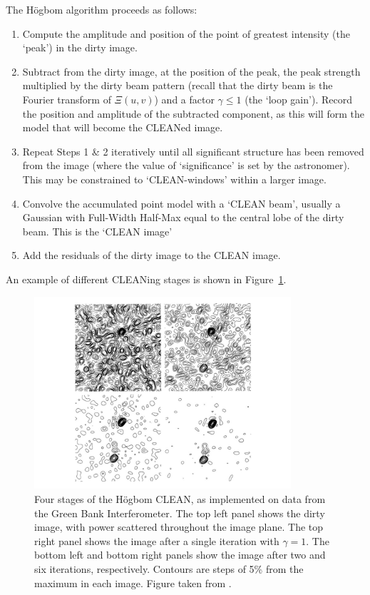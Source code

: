 The H{\"o}gbom algorithm proceeds as follows:
\begin{enumerate}
\item Compute the amplitude and position of the point of greatest intensity (the `peak') in the dirty image.
\item Subtract from the dirty image, at the position of the peak, the peak strength multiplied by the dirty beam pattern (recall that the dirty beam is the Fourier transform of $\Xi(u,v)$) and a factor $\gamma \leqslant 1$ (the `loop gain'). Record the position and amplitude of the subtracted component, as this will form the model that will become the CLEANed image.
\item Repeat Steps 1 \& 2 iteratively until all significant structure has been removed from the image (where the value of `significance' is set by the astronomer). This may be constrained to `CLEAN-windows' within a larger image.
\item Convolve the accumulated point model with a `CLEAN beam', usually a Gaussian with Full-Width Half-Max equal to the central lobe of the dirty beam. This is the `CLEAN image'
\item Add the residuals of the dirty image to the CLEAN image.
\end{enumerate}

An example of different CLEANing stages is shown in Figure~\ref{fig:gbt_clean_example}.

\begin{figure}
\centering
\includegraphics[width=0.85\textwidth]{chapters/interferometry/figures/gbt_clean.pdf}
\caption[Four stages of the H{\"o}gbom CLEAN.]{Four stages of the H{\"o}gbom CLEAN, as implemented on data from the Green Bank Interferometer. The top left panel shows the dirty image, with power scattered throughout the image plane. The top right panel shows the image after a single iteration with $\gamma=1$. The bottom left and bottom right panels show the image after two and six iterations, respectively. Contours are steps of 5\% from the maximum in each image. Figure taken from \cite{Hogbom.74, TMS}.}
\label{fig:gbt_clean_example}
\end{figure}

